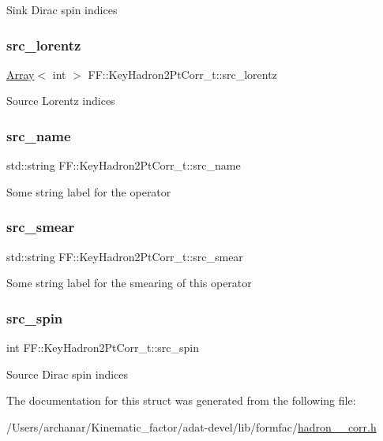 Sink Dirac spin indices \mbox{\label{structFF_1_1KeyHadron2PtCorr__t_acddd5d0d6ec97de524d479b1edb16a14}} 
\subsubsection{\texorpdfstring{src\_lorentz}{src\_lorentz}}
{\footnotesize\ttfamily \mbox{\hyperlink{classXMLArray_1_1Array}{Array}}$<$ int $>$ F\+F\+::\+Key\+Hadron2\+Pt\+Corr\+\_\+t\+::src\+\_\+lorentz}

Source Lorentz indices \mbox{\label{structFF_1_1KeyHadron2PtCorr__t_a5d1d30144384ebdfc82e725835245bed}} 
\subsubsection{\texorpdfstring{src\_name}{src\_name}}
{\footnotesize\ttfamily std\+::string F\+F\+::\+Key\+Hadron2\+Pt\+Corr\+\_\+t\+::src\+\_\+name}

Some string label for the operator \mbox{\label{structFF_1_1KeyHadron2PtCorr__t_a1737b7df94def3fddeaa347d8374f91a}} 
\subsubsection{\texorpdfstring{src\_smear}{src\_smear}}
{\footnotesize\ttfamily std\+::string F\+F\+::\+Key\+Hadron2\+Pt\+Corr\+\_\+t\+::src\+\_\+smear}

Some string label for the smearing of this operator \mbox{\label{structFF_1_1KeyHadron2PtCorr__t_a1342253cc1dd2982124bf3e04e478ff6}} 
\subsubsection{\texorpdfstring{src\_spin}{src\_spin}}
{\footnotesize\ttfamily int F\+F\+::\+Key\+Hadron2\+Pt\+Corr\+\_\+t\+::src\+\_\+spin}

Source Dirac spin indices 

The documentation for this struct was generated from the following file\+:\begin{DoxyCompactItemize}
\item 
/\+Users/archanar/\+Kinematic\+\_\+factor/adat-\/devel/lib/formfac/\mbox{\hyperlink{adat-devel_2lib_2formfac_2hadron__2pt__corr_8h}{hadron\+\_\+2pt\+\_\+corr.\+h}}\end{DoxyCompactItemize}
